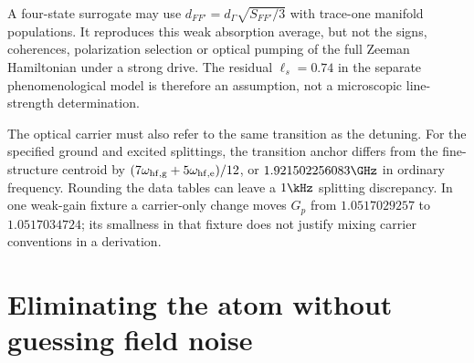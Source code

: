 A four-state surrogate may use $d_{FF'}=d_\Gamma\sqrt{S_{FF'}/3}$ with
trace-one manifold populations. It reproduces this weak absorption average,
but not the signs, coherences, polarization selection or optical pumping of
the full Zeeman Hamiltonian under a strong drive. The residual $\ell_s=0.74$
in the separate phenomenological model is therefore an assumption, not a
microscopic line-strength determination.

The optical carrier must also refer to the same transition as the detuning.
For the specified ground and excited splittings, the transition anchor differs
from the fine-structure centroid by
$(7\omega_{\rm hf,g}+5\omega_{\rm hf,e})/12$, or
$1.921502256083\GHz$ in ordinary frequency. Rounding the data tables can
leave a $1\kHz$ splitting discrepancy. In one weak-gain fixture a carrier-only
change moves $G_p$ from $1.0517029257$ to $1.0517034724$; its smallness in that
fixture does not justify mixing carrier conventions in a derivation.

\section{Eliminating the atom without guessing field noise}
\label{sec:gc-field}

